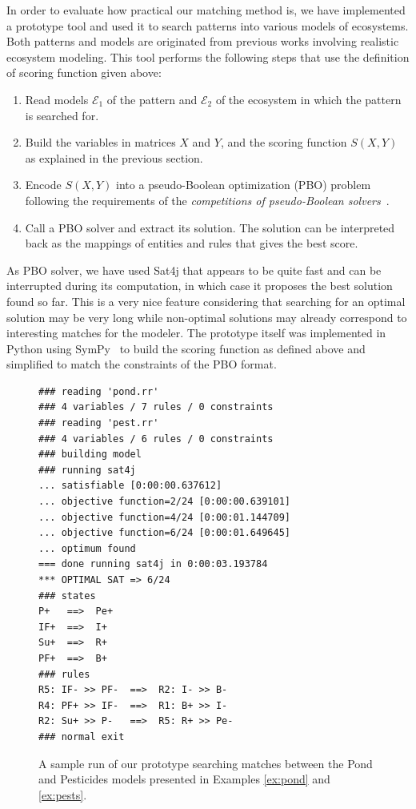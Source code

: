 \documentclass[a4paper,twoside]{article}
\begin{document}
In order to evaluate how practical our matching method is, we have implemented a prototype tool and used it to search patterns into various models of ecosystems.
Both patterns and models are originated from previous works involving  realistic ecosystem modeling.
This tool performs the following steps that use the definition of scoring function given above:
%
\begin{enumerate}
\item Read  models $\mathcal{E}_1$ of the pattern and
  $\mathcal{E}_2$ of the ecosystem in which the pattern is searched for.
\item Build the variables in matrices $X$ and $Y$, and the scoring function
  $S(X,Y)$ as explained in the previous section.
\item Encode $S(X,Y)$ into a pseudo-Boolean optimization (PBO) problem following the requirements of the \emph{competitions of pseudo-Boolean solvers}~\cite{opb-format,pb16}.
\item Call a PBO solver and extract its solution. The solution can be interpreted back as the mappings of entities and rules that gives the best score.
\end{enumerate}
%
As  PBO solver, we have used Sat4j that appears to be quite fast and can be interrupted during its computation, in which case it proposes the best solution found so far.
This is a very nice feature considering that searching for an optimal solution may be very long while non-optimal solutions may already correspond to interesting matches for the modeler.
The prototype itself was implemented in Python using SymPy~\cite{sympy} to build the scoring function as defined above and simplified  to match the constraints of the PBO format.

\begin{figure}[t]
\begin{small}
\begin{verbatim}
### reading 'pond.rr'
### 4 variables / 7 rules / 0 constraints
### reading 'pest.rr'
### 4 variables / 6 rules / 0 constraints
### building model
### running sat4j
... satisfiable [0:00:00.637612]
... objective function=2/24 [0:00:00.639101]
... objective function=4/24 [0:00:01.144709]
... objective function=6/24 [0:00:01.649645]
... optimum found
=== done running sat4j in 0:00:03.193784
*** OPTIMAL SAT => 6/24
### states
P+   ==>  Pe+
IF+  ==>  I+
Su+  ==>  R+
PF+  ==>  B+
### rules
R5: IF- >> PF-  ==>  R2: I- >> B-
R4: PF+ >> IF-  ==>  R1: B+ >> I-
R2: Su+ >> P-   ==>  R5: R+ >> Pe-
### normal exit
\end{verbatim}
\end{small}
\caption{A sample run of our prototype searching matches between the Pond and Pesticides models presented in Examples \ref{ex:pond} and \ref{ex:pests}.}
\label{fig:run}
\end{figure}
\end{document}
